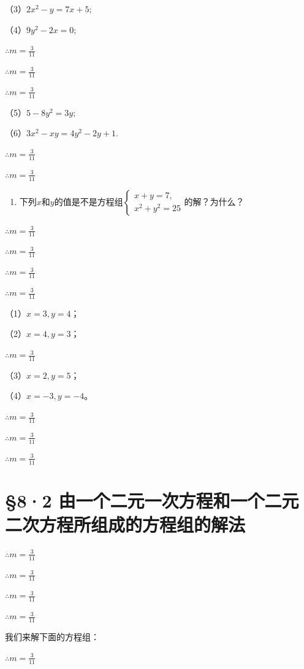 （3）\(2x^{2} - y = 7x + 5;\)

（4）\(9y^{2} - 2x = 0;\)

\(\therefore m = \frac{3}{11}\)

\(\therefore m = \frac{3}{11}\)

\(\therefore m = \frac{3}{11}\)

（5）\(5 - 8y^{2} = 3y;\)

（6）\(3x^{2} - xy = 4y^{2} - 2y + 1.\)

\(\therefore m = \frac{3}{11}\)

\(\therefore m = \frac{3}{11}\)

\begin{enumerate}[start=2]
\item
  下列\(x\)和\(y\)的值是不是方程组\(\left\{ \begin{array}{l} x + y = 7, \\ x^2 + y^2 = 25 \end{array} \right.\)的解？为什么？
\end{enumerate}

\(\therefore m = \frac{3}{11}\)

\(\therefore m = \frac{3}{11}\)

\(\therefore m = \frac{3}{11}\)

\(\therefore m = \frac{3}{11}\)

（1）\(x = 3, y = 4\)；

（2）\(x = 4, y = 3\)；

\(\therefore m = \frac{3}{11}\)

（3）\(x = 2, y = 5\)；

（4）\(x = -3, y = -4\)。

\(\therefore m = \frac{3}{11}\)

\(\therefore m = \frac{3}{11}\)

\(\therefore m = \frac{3}{11}\)

\section{§8·2 由一个二元一次方程和一个二元二次方程所组成的方程组的解法}

\(\therefore m = \frac{3}{11}\)

\(\therefore m = \frac{3}{11}\)

\(\therefore m = \frac{3}{11}\)

\(\therefore m = \frac{3}{11}\)

我们来解下面的方程组：

\(\therefore m = \frac{3}{11}\)

